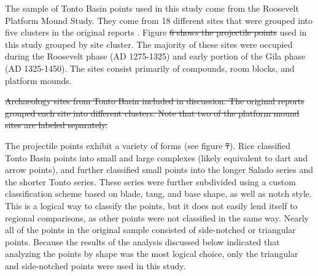 \documentclass[a4paper]{article}
\providecommand{\DIFadd}[1]{{\protect\color{blue}\uwave{#1}}} %
\providecommand{\DIFdel}[1]{{\protect\color{red}\sout{#1}}}                      %
\providecommand{\DIFaddbegin}{} %
\providecommand{\DIFaddend}{} %
\providecommand{\DIFdelbegin}{} %
\providecommand{\DIFdelend}{} %
\providecommand{\DIFdelFL}[1]{\DIFdel{#1}} %
\begin{document}
The sample of Tonto Basin points used in this study come from the Roosevelt Platform Mound Study. They come from 18 different sites that were grouped into five clusters in the original reports \autocite[see][ for an overview]{Rice1998-ku}. Figure \DIFdelbegin \DIFdel{6 shows the projectile points }\DIFdelend \DIFaddbegin \DIFadd{1 shows the sites }\DIFaddend used in this study grouped by site cluster. The majority of these sites were occupied during the Roosevelt phase (AD 1275-1325) and early portion of the Gila phase (AD 1325-1450). The sites consist primarily of compounds, room blocks, and platform mounds.

\DIFdelbegin %
{%
\DIFdelFL{Archaeology sites from Tonto Basin included in discussion. The original reports grouped each site into different clusters. Note that two of the platform mound sites are labeled separately.}}%

\DIFdelend The projectile points exhibit a variety of forms (see figure \DIFdelbegin \DIFdel{7}\DIFdelend \DIFaddbegin \DIFadd{6}\DIFaddend ). Rice \autocite*{Rice1994-rk} classified Tonto Basin points into small and large complexes (likely equivalent to dart and arrow points), and further classified small points into the longer Salado series and the shorter Tonto series. These series were further subdivided using a custom classification scheme based on blade, tang, and base shape, as well as notch style. This is a logical way to classify the points, but it does not easily lend itself to regional comparisons, as other points were not classified in the same way. Nearly all of the points in the original sample consisted of side-notched or triangular points. Because the results of the analysis discussed below indicated that analyzing the \DIFaddbegin \DIFadd{projectile }\DIFaddend points by shape was the most logical choice, only the triangular and side-notched points were used in this study.
\end{document}
